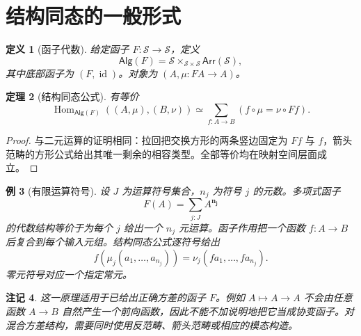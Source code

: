 \documentclass[12pt,oneside,openany,fontset=none]{ctexbook}
\theoremstyle{cn}
\newtheorem{definition}{定义}[chapter]
\newtheorem{example}[definition]{例}
\newtheorem{theorem}[definition]{定理}
\newtheorem{remark}[definition]{注记}
\numberwithin{equation}{chapter}
\newcommand{\Sp}{\mathcal S}
\newcommand{\id}{\operatorname{id}}
\newcommand{\Hom}{\operatorname{Hom}}
\begin{document}
\section{结构同态的一般形式}
\begin{definition}[函子代数]
给定函子 $F:\Sp\to\Sp$，定义
\[
\mathsf{Alg}(F)=
\Sp\times_{\Sp\times\Sp}\mathsf{Arr}(\Sp),
\]
其中底部函子为 $(F,\id)$。对象为 $(A,\mu:FA\to A)$。
\end{definition}
\begin{theorem}[结构同态公式]
有等价
\[
\Hom_{\mathsf{Alg}(F)}((A,\mu),(B,\nu))
\simeq
\sum_{f:A\to B}(f\circ\mu=\nu\circ Ff).
\]
\end{theorem}
\begin{proof}
与二元运算的证明相同：拉回把交换方形的两条竖边固定为 $Ff$ 与 $f$，箭头范畴的方形公式给出其唯一剩余的相容类型。全部等价均在映射空间层面成立。
\end{proof}
\begin{example}[有限运算符号]
设 $J$ 为运算符号集合，$n_j$ 为符号 $j$ 的元数。多项式函子
\[
F(A)=\sum_{j:J}A^{\mathbf{n_j}}
\]
的代数结构等价于为每个 $j$ 给出一个 $n_j$ 元运算。函子作用把一个函数 $f:A\to B$ 后复合到每个输入元组。结构同态公式逐符号给出
\[
f(\mu_j(a_1,\ldots,a_{n_j}))
=\nu_j(fa_1,\ldots,fa_{n_j}).
\]
零元符号对应一个指定常元。
\end{example}
\begin{remark}
这一原理适用于已给出正确方差的函子 $F$。例如 $A\mapsto A\to A$ 不会由任意函数 $A\to B$ 自然产生一个前向函数，因此不能不加说明地把它当成协变函子。对混合方差结构，需要同时使用反范畴、箭头范畴或相应的模态构造。
\end{remark}
\end{document}
